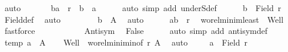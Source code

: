 \begin{isabellebody}
\ auto\isanewline
\ \ \ \ \isamarkupfalse%
\ {}{}{\isacharcolon}{\kern0pt}\ {\isachardoublequoteopen}{\isacharparenleft}{\kern0pt}b{\isacharcomma}{\kern0pt}{\isacharquery}{\kern0pt}a{\isacharparenright}{\kern0pt}\ {\isasymin}\ r\ {\isasymand}\ b\ {\isasymnoteq}\ {\isacharquery}{\kern0pt}a{\isachardoublequoteclose}\isanewline
\ \ \ \ \isamarkupfalse%
\ {\isacharparenleft}{\kern0pt}auto\ simp\ add{\isacharcolon}{\kern0pt}\ underS{\isacharunderscore}{\kern0pt}def{\isacharparenright}{\kern0pt}\isanewline
\ \ \ \ \isamarkupfalse%
\ {\isachardoublequoteopen}b\ {\isasymin}\ Field\ r{\isachardoublequoteclose}\ \isamarkupfalse%
\ Field{\isacharunderscore}{\kern0pt}def\ \isamarkupfalse%
\ auto\isanewline
\ \ \ \ \isamarkupfalse%
\ {}{}\ \isamarkupfalse%
\ {\isachardoublequoteopen}b\ {\isasymin}\ {\isacharquery}{\kern0pt}A{\isachardoublequoteclose}\ \isamarkupfalse%
\ auto\isanewline
\ \ \ \ \isamarkupfalse%
\ {\isachardoublequoteopen}{\isacharparenleft}{\kern0pt}{\isacharquery}{\kern0pt}a{\isacharcomma}{\kern0pt}b{\isacharparenright}{\kern0pt}\ {\isasymin}\ r{\isachardoublequoteclose}\ \isamarkupfalse%
\ wo{\isacharunderscore}{\kern0pt}rel{\isachardot}{\kern0pt}minim{\isacharunderscore}{\kern0pt}least\ {}\ Well\ \isamarkupfalse%
\ fastforce\isanewline
\ \ \ \ \isanewline
\ \ \ \ \isamarkupfalse%
\ {}{}\ Antisym\ \isamarkupfalse%
\ False\isanewline
\ \ \ \ \isamarkupfalse%
\ {\isacharparenleft}{\kern0pt}auto\ simp\ add{\isacharcolon}{\kern0pt}\ antisym{\isacharunderscore}{\kern0pt}def{\isacharparenright}{\kern0pt}\isanewline
\ \ \isamarkupfalse%
\isanewline
\ \ \isamarkupfalse%
\ temp{\isacharcolon}{\kern0pt}\ {\isachardoublequoteopen}{\isacharquery}{\kern0pt}a\ {\isasymin}\ {\isacharquery}{\kern0pt}A{\isachardoublequoteclose}\isanewline
\ \ \isamarkupfalse%
\ Well\ {}\ wo{\isacharunderscore}{\kern0pt}rel{\isachardot}{\kern0pt}minim{\isacharunderscore}{\kern0pt}in{\isacharbrackleft}{\kern0pt}of\ r\ {\isacharquery}{\kern0pt}A{\isacharbrackright}{\kern0pt}\ \isamarkupfalse%
\ auto\isanewline
\ \ \isamarkupfalse%
\ {}{\isacharcolon}{\kern0pt}\ {\isachardoublequoteopen}{\isacharquery}{\kern0pt}a\ {\isasymin}\ Field\ r{\isachardoublequoteclose}\ \isamarkupfalse%

\end{isabellebody}
